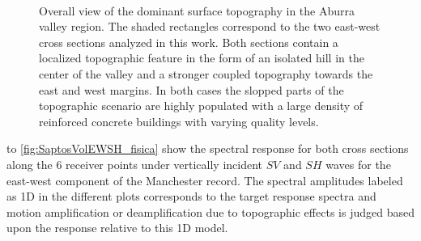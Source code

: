 \documentclass[11pt,letterpaper]{article}
\begin{document}
\begin{figure}[H]
	\centering
	\\
	\caption{\small Overall view of the dominant surface topography in the Aburra valley region. The shaded rectangles correspond to the two east-west cross sections analyzed in this work. Both sections contain a localized topographic feature in the form of an isolated hill in the center of the valley and a stronger coupled topography towards the east and west margins. In both cases the slopped parts of the topographic scenario are highly populated with a large density of reinforced concrete buildings with varying quality levels.}
	\label{fig:secciones1}
\end{figure}


 to \cref{fig:SaptosVolEWSH_fisica} show the spectral response for both cross sections along the 6 receiver points under vertically incident $SV$ and $SH$ waves for the east-west component of the Manchester record. The spectral amplitudes labeled as 1D in the different plots corresponds to the target response spectra and motion amplification or deamplification due to topographic effects is judged based upon the response relative to this 1D model.
\end{document}
